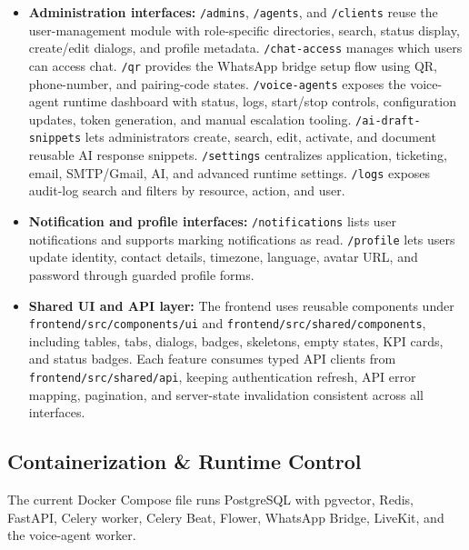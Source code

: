 \begin{itemize}
    \item \textbf{Administration interfaces:} \texttt{/admins}, \texttt{/agents}, and \texttt{/clients} reuse the user-management module with role-specific directories, search, status display, create/edit dialogs, and profile metadata. \texttt{/chat-access} manages which users can access chat. \texttt{/qr} provides the WhatsApp bridge setup flow using QR, phone-number, and pairing-code states. \texttt{/voice-agents} exposes the voice-agent runtime dashboard with status, logs, start/stop controls, configuration updates, token generation, and manual escalation tooling. \texttt{/ai-draft-snippets} lets administrators create, search, edit, activate, and document reusable AI response snippets. \texttt{/settings} centralizes application, ticketing, email, SMTP/Gmail, AI, and advanced runtime settings. \texttt{/logs} exposes audit-log search and filters by resource, action, and user.
    \item \textbf{Notification and profile interfaces:} \texttt{/notifications} lists user notifications and supports marking notifications as read. \texttt{/profile} lets users update identity, contact details, timezone, language, avatar URL, and password through guarded profile forms.
    \item \textbf{Shared UI and API layer:} The frontend uses reusable components under \texttt{frontend/src/components/ui} and \texttt{frontend/src/shared/components}, including tables, tabs, dialogs, badges, skeletons, empty states, KPI cards, and status badges. Each feature consumes typed API clients from \texttt{frontend/src/shared/api}, keeping authentication refresh, API error mapping, pagination, and server-state invalidation consistent across all interfaces.
\end{itemize}

\subsection{Containerization \& Runtime Control}

The current Docker Compose file runs PostgreSQL with pgvector, Redis, FastAPI, Celery worker, Celery Beat, Flower, WhatsApp Bridge, LiveKit, and the voice-agent worker.

